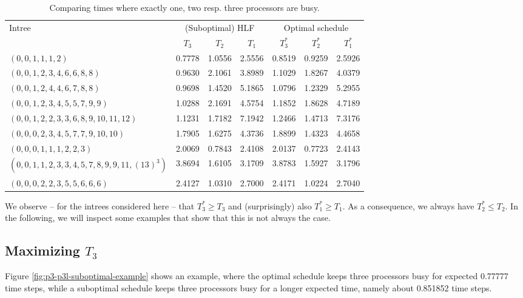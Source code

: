 \begin{table}[th]
  \centering
  \begin{tabular}[ht]{l|ccc|ccc}
    \multirow{2}{*}{Intree} & \multicolumn{3}{c|}{(Suboptimal) HLF} & \multicolumn{3}{c}{Optimal schedule} \\
    & $T_3$ & $T_2$ & $T_1$ & $T_3^*$ & $T_2^*$ & $T_1^*$ \\
    \hline
    $(0,0,1,1,1,2)$ & 0.7778 & 1.0556 & 2.5556 & 0.8519 & 0.9259 & 2.5926 \\
    $(0,0,1,2,3,4,6,6,8,8)$ & 0.9630 & 2.1061 & 3.8989 & 1.1029 & 1.8267 & 4.0379 \\
    $(0,0,1,2,4,4,6,7,8,8)$ & 0.9698 & 1.4520 & 5.1865 & 1.0796 & 1.2329 & 5.2955 \\
    $(0,0,1,2,3,4,5,5,7,9,9)$ & 1.0288 & 2.1691 & 4.5754 & 1.1852 & 1.8628 & 4.7189 \\
    $(0,0,1,2,2,3,3,6,8,9,10,11,12)$ & 1.1231 & 1.7182 & 7.1942 & 1.2466 & 1.4713 & 7.3176 \\
    $(0,0,0,2,3,4,5,7,7,9,10,10)$ & 1.7905 & 1.6275 & 4.3736 & 1.8899 & 1.4323 & 4.4658 \\
    $(0,0,0,1,1,1,2,2,3)$ & 2.0069 & 0.7843 & 2.4108 & 2.0137 & 0.7723 & 2.4143 \\ 
    $(0,0,1,1,2,3,3,4,5,7,8,9,9,11,(13)^3)$ 
      & 3.8694 & 1.6105 & 3.1709 & 3.8783 & 1.5927 & 3.1796 \\
    $(0,0,0,2,2,3,5,5,6,6,6)$ & 2.4127 & 1.0310 & 2.7000 & 2.4171 & 1.0224 & 2.7040
  \end{tabular}
  \caption{Comparing times where exactly one, two resp. three processors are busy.}
  \label{tab:comparing-t1-t2-t3-selected-intrees}
\end{table}

We observe -- for the intrees considered here -- that $T_3^* \geq T_3$ and (surprisingly) also $T_1^* \geq T_1$. As a consequence, we always have $T_2^* \leq T_2$. In the following, we will inspect some examples that show that this is not always the case.

\subsection{Maximizing $T_3$}
\label{sec:p3-disproving-long-p3}

Figure \ref{fig:p3-p3l-suboptimal-example} shows an example, where the optimal schedule keeps three processors busy for expected 0.77777 time steps, while a suboptimal schedule keeps three processors busy for a longer expected time, namely about 0.851852 time steps.

